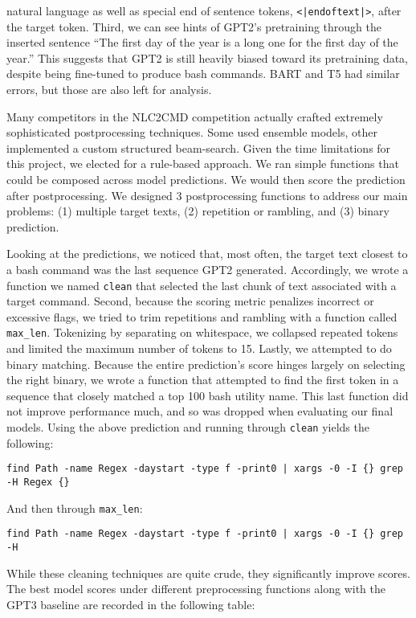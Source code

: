 \documentclass{article}
\begin{document}
natural language as well as special end of sentence tokens,
\texttt{<|endoftext|>}, after the target token. Third, we can see hints of
GPT2's pretraining through the inserted sentence ``The first day of the year is
a long one for the first day of the year.'' This suggests that GPT2 is still
heavily biased toward its pretraining data, despite being fine-tuned to produce
bash commands. BART and T5 had similar errors, but those are also left for
analysis.
\par
Many competitors in the NLC2CMD competition actually crafted extremely
sophisticated postprocessing techniques. Some used ensemble models, other
implemented a custom structured beam-search. Given the time limitations for
this project, we elected for a rule-based approach. We ran simple functions
that could be composed across model predictions. We would then score the
prediction after postprocessing. We designed 3 postprocessing functions to
address our main problems: (1) multiple target texts, (2) repetition or
rambling, and (3) binary prediction.
\par
Looking at the predictions, we noticed that, most often, the target text
closest to a bash command was the last sequence GPT2 generated. Accordingly, we
wrote a function we named \texttt{clean} that selected the last chunk of text
associated with a target command. Second, because the scoring metric penalizes
incorrect or excessive flags, we tried to trim repetitions and rambling with a
function called \texttt{max\_len}. Tokenizing by separating on whitespace, we
collapsed repeated tokens and limited the maximum number of tokens to 15.
Lastly, we attempted to do binary matching. Because the entire prediction's
score hinges largely on selecting the right binary, we wrote a function that
attempted to find the first token in a sequence that closely matched a top 100
bash utility name. This last function did not improve performance much, and so
was dropped when evaluating our final models. Using the above prediction and
running through \texttt{clean} yields the following:
\begin{verbatim}
find Path -name Regex -daystart -type f -print0 | xargs -0 -I {} grep -H Regex {}
\end{verbatim}
And then through \texttt{max\_len}:
\begin{verbatim}
find Path -name Regex -daystart -type f -print0 | xargs -0 -I {} grep -H
\end{verbatim}
While these cleaning techniques are quite crude, they significantly improve
scores. The best model scores under different preprocessing functions along
with the GPT3 baseline are recorded in the following table:
\end{document}
